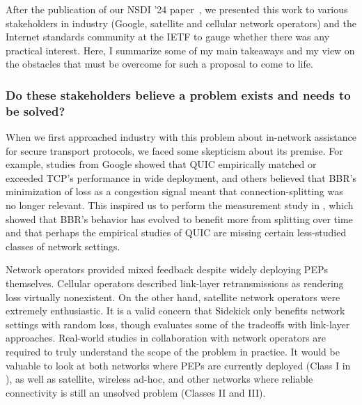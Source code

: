 After the publication of our NSDI '24 paper~\cite{yuan2024sidekick}, we
presented this work to various stakeholders in industry (Google, satellite and
cellular network operators) and the Internet standards community at the IETF to
gauge whether there was any practical interest. Here, I summarize some of my
main takeaways and my view on the obstacles that must be overcome for such a
proposal to come to life.

\subsubsection{Do these stakeholders believe a problem exists and needs to be
 solved?}

When we first approached industry with this problem about in-network assistance
for secure transport protocols, we faced some skepticism about its premise.
For example, studies from Google showed that QUIC empirically matched or
exceeded TCP's performance in wide deployment, and others believed that BBR's
minimization of loss as a congestion signal meant that connection-splitting
was no longer relevant. This inspired us to perform the measurement study in
, which showed that BBR's behavior has evolved to benefit
more from splitting over time and that perhaps the empirical studies of QUIC
are missing certain less-studied classes of network settings.

Network operators provided mixed feedback despite widely deploying PEPs
themselves. Cellular operators described link-layer retransmissions as
rendering loss virtually nonexistent. On the other hand, satellite network
operators were extremely enthusiastic. It is a valid concern that Sidekick
only benefits network settings with random loss, though 
evaluates some of the tradeoffs with link-layer approaches. Real-world studies
in collaboration with network operators are required to truly understand the
scope of the problem in practice. It would be valuable to look at both networks
where PEPs are currently deployed (Class I in ), as well as
satellite, wireless ad-hoc, and other networks where reliable connectivity is
still an unsolved problem (Classes II and III).

